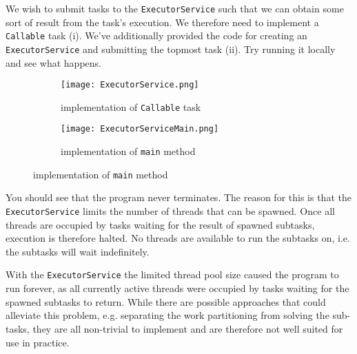 \documentclass[main.tex]{subfiles}
\begin{document}
\begin{example}
    We wish to submit tasks to the \texttt{ExecutorService} such that we can obtain some sort of result from the task's execution. We therefore need to implement a \texttt{Callable} task (i). We've additionally provided the code for creating an \texttt{ExecutorService} and submitting the topmost task (ii). Try running it locally and see what happens. 
    \begin{figure}[H]
        \centering
        \begin{subfigure}{.5\textwidth}
            \centering
            \texttt{[image: ExecutorService.png]}
            \caption{implementation of \texttt{Callable} task}
        \end{subfigure}%
        \begin{subfigure}{.5\textwidth}
            \centering
            \texttt{[image: ExecutorServiceMain.png]}
            \caption{implementation of \texttt{main} method}
        \end{subfigure}
    \end{figure}
    \noindent You should see that the program never terminates. The reason for this is that the \texttt{ExecutorService} limits the number of threads that can be spawned. Once all threads are occupied by tasks waiting for the result of spawned subtasks, execution is therefore halted. No threads are available to run the subtasks on, i.e. the subtasks will wait indefinitely.
\end{example}
With the \texttt{ExecutorService} the limited thread pool size caused the program to run forever, as all currently active threads were occupied by tasks waiting for the spawned subtasks to return. While there are possible approaches that could alleviate this problem, e.g. separating the work partitioning from solving the sub-tasks, they are all non-trivial to implement and are therefore not well suited for use in practice.

\end{document}
